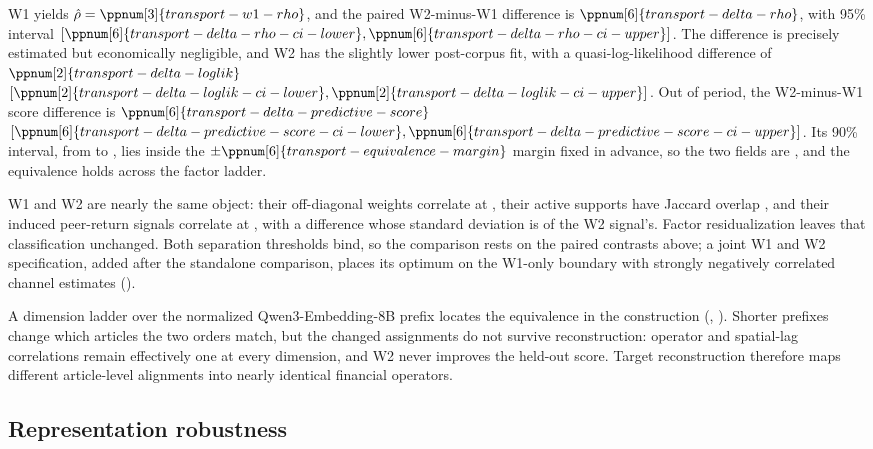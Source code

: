 W1 yields $\hat\rho=\ppnum[3]{transport-w1-rho}$, and the paired W2-minus-W1
difference is $\ppnum[6]{transport-delta-rho}$, with 95\% interval
$[\ppnum[6]{transport-delta-rho-ci-lower},
\ppnum[6]{transport-delta-rho-ci-upper}]$.
The difference is precisely estimated but economically negligible, and W2 has
the slightly lower post-corpus fit, with a quasi-log-likelihood difference of
$\ppnum[2]{transport-delta-loglik}$
$[\ppnum[2]{transport-delta-loglik-ci-lower},
\ppnum[2]{transport-delta-loglik-ci-upper}]$.
Out of period, the W2-minus-W1 score difference is
$\ppnum[6]{transport-delta-predictive-score}$
$[\ppnum[6]{transport-delta-predictive-score-ci-lower},
\ppnum[6]{transport-delta-predictive-score-ci-upper}]$.
Its 90\% interval, from  to
, lies inside the
$\pm\ppnum[6]{transport-equivalence-margin}$ margin fixed in advance, so
the two fields are , and the equivalence
holds across the factor ladder.

W1 and W2 are nearly the same object: their off-diagonal weights correlate at
,
their active supports have Jaccard overlap
, and their induced peer-return
signals correlate at , with a difference
whose standard deviation is 
of the W2 signal's.
Factor residualization leaves that classification unchanged. Both separation
thresholds bind, so the comparison rests on the paired contrasts above; a joint
W1 and W2 specification, added after the standalone comparison, places its
optimum on the W1-only boundary with strongly negatively correlated channel
estimates ().

A dimension ladder over the normalized Qwen3-Embedding-8B prefix locates the
equivalence in the construction
(,
).
Shorter prefixes change which articles the two orders match, but the changed
assignments do not survive reconstruction: operator and spatial-lag
correlations remain effectively one at every dimension, and W2 never improves
the held-out score.
Target reconstruction therefore maps different article-level alignments into
nearly identical financial operators.

\subsection{Representation robustness}
\label{sec:results-representation}

